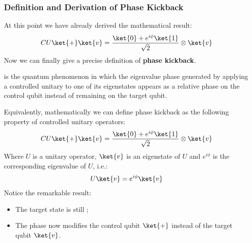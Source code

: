 \subsubsection{Definition and Derivation of Phase Kickback}\label{ex:phase-kickback-definition-and-derivation}

At this point we have already derived the mathematical result:
\begin{equation*}
    CU \ket{+}\ket{v} = \frac{\ket{0} + e^{i\phi}\ket{1}}{\sqrt{2}} \otimes \ket{v}
\end{equation*}
Now we can finally give a precise definition of \textbf{phase kickback}.

\highspace
\begin{definitionbox}
     is the quantum phenomenon in which the eigenvalue phase generated by applying a controlled unitary to one of its eigenstates appears as a relative phase on the control qubit instead of remaining on the target qubit.

    \highspace
    Equivalently, mathematically we can define phase kickback as the following property of controlled unitary operators:
    \begin{equation}\label{eq:phase-kickback-definition}
        CU\ket{+}\ket{v} = \frac{\ket{0} + e^{i\phi}\ket{1}}{\sqrt{2}} \otimes \ket{v}
    \end{equation}
    Where $U$ is a unitary operator, $\ket{v}$ is an eigenstate of $U$ and $e^{i\phi}$ is the corresponding eigenvalue of $U$, i.e.:
    \begin{equation*}
        U\ket{v} = e^{i\phi}\ket{v}
    \end{equation*}
    Notice the remarkable result:
    \begin{itemize}
        \item The target state is still ;
        \item The phase now modifies the control qubit $\ket{+}$ instead of the target qubit $\ket{v}$.
    \end{itemize}


\end{definitionbox}
